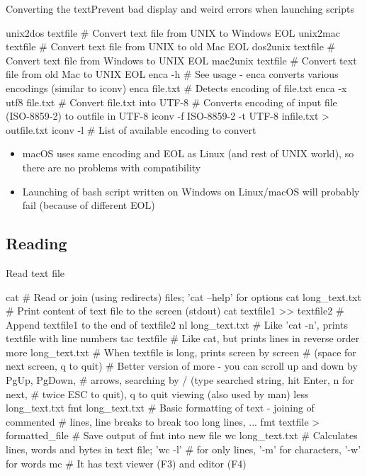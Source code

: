\documentclass[compress, xelatex, 11pt, xcolor=svgnames, aspectratio=169,
	hyperref={
		bookmarks=true,
		unicode=true,
		colorlinks=true,
		pdftitle={Linux, command line and MetaCentrum},
		plainpages=false,
		pdfauthor={Vojtech Zeisek},
		pdfsubject={Course about use of Linux command line, writing shell scripts and using MetaCentrum of CESNET},
		pdfcreator={XeLaTeX},
		pdfkeywords={Linux, GNU, BASH, shell, command line, MetaCentrum},
		linkcolor=DarkRed, %
		anchorcolor=DarkBlue, %
		citecolor=Indigo, %
		filecolor=NavyBlue, %
		menucolor=DarkMagenta, %
		urlcolor=DarkBlue, %
		},
	url={hyphens, lowtilde} %
	]{beamer}
\begin{document}
\begin{frame}[fragile]{Converting the text}{Prevent bad display and weird errors when launching scripts}
	\label{eolencoding}
	\begin{bashcode}
    unix2dos textfile # Convert text file from UNIX to Windows EOL
    unix2mac textfile # Convert text file from UNIX to old Mac EOL
    dos2unix textfile # Convert text file from Windows to UNIX EOL
    mac2unix textfile # Convert text file from old Mac to UNIX EOL
    enca -h # See usage - enca converts various encodings (similar to iconv)
    enca file.txt # Detects encoding of file.txt
    enca -x utf8 file.txt # Convert file.txt into UTF-8
    # Converts encoding of input file (ISO-8859-2) to outfile in UTF-8
    iconv -f ISO-8859-2 -t UTF-8 infile.txt > outfile.txt
    iconv -l # List of available encoding to convert
	\end{bashcode}
	\begin{itemize}
		\item macOS uses same encoding and EOL as Linux (and rest of UNIX world), so there are no problems with compatibility
		\item Launching of bash script written on Windows on Linux/macOS will probably fail (because of different EOL)
	\end{itemize}
\end{frame}

\subsection{Reading}

\begin{frame}[fragile]{Read text file}
	\begin{bashcode}
    cat # Read or join (using redirects) files; 'cat --help' for options
    cat long_text.txt # Print content of text file to the screen (stdout)
    cat textfile1 >> textfile2 # Append textfile1 to the end of textfile2
    nl long_text.txt # Like 'cat -n', prints textfile with line numbers
    tac textfile # Like cat, but prints lines in reverse order
    more long_text.txt # When textfile is long, prints screen by screen
                       # (space for next screen, q to quit)
    # Better version of more - you can scroll up and down by PgUp, PgDown,
    # arrows, searching by / (type searched string, hit Enter, n for next,
    # twice ESC to quit), q to quit viewing (also used by man)
    less long_text.txt
    fmt long_text.txt # Basic formatting of text - joining of commented
                      # lines, line breaks to break too long lines, ...
    fmt textfile > formatted_file # Save output of fmt into new file
    wc long_text.txt # Calculates lines, words and bytes in text file; 'wc -l'
                     # for only lines, '-m' for characters, '-w' for words
    mc # It has text viewer (F3) and editor (F4)
	\end{bashcode}
\end{frame}
\end{document}
